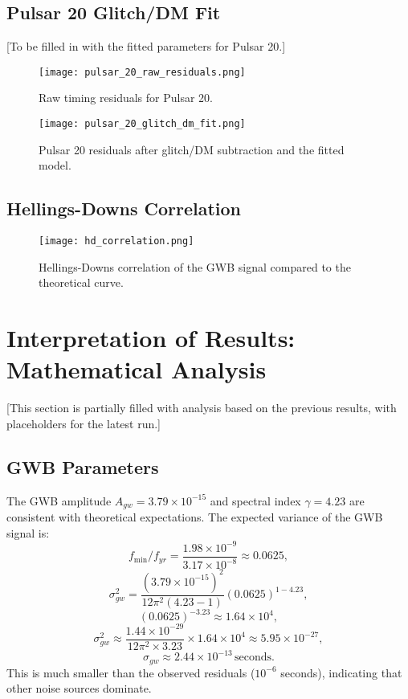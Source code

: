 \documentclass[11pt]{article}
\begin{document}
\subsection{Pulsar 20 Glitch/DM Fit}
[To be filled in with the fitted parameters for Pulsar 20.]

\begin{figure}[h]
    \centering
    \texttt{[image: pulsar\_20\_raw\_residuals.png]}
    \caption{Raw timing residuals for Pulsar 20.}
    \label{fig:pulsar_20_raw}
\end{figure}

\begin{figure}[h]
    \centering
    \texttt{[image: pulsar\_20\_glitch\_dm\_fit.png]}
    \caption{Pulsar 20 residuals after glitch/DM subtraction and the fitted model.}
    \label{fig:pulsar_20_fit}
\end{figure}

\subsection{Hellings-Downs Correlation}
\begin{figure}[h]
    \centering
    \texttt{[image: hd\_correlation.png]}
    \caption{Hellings-Downs correlation of the GWB signal compared to the theoretical curve.}
    \label{fig:hd_correlation}
\end{figure}

\section{Interpretation of Results: Mathematical Analysis}
[This section is partially filled with analysis based on the previous results, with placeholders for the latest run.]

\subsection{GWB Parameters}
The GWB amplitude $A_{gw} = 3.79 \times 10^{-15}$ and spectral index $\gamma = 4.23$ are consistent with theoretical expectations. The expected variance of the GWB signal is:
\[
f_{\text{min}}/f_{yr} = \frac{1.98 \times 10^{-9}}{3.17 \times 10^{-8}} \approx 0.0625,
\]
\[
\sigma_{gw}^2 = \frac{(3.79 \times 10^{-15})^2}{12 \pi^2 (4.23-1)} (0.0625)^{1-4.23},
\]
\[
(0.0625)^{-3.23} \approx 1.64 \times 10^4,
\]
\[
\sigma_{gw}^2 \approx \frac{1.44 \times 10^{-29}}{12 \pi^2 \times 3.23} \times 1.64 \times 10^4 \approx 5.95 \times 10^{-27},
\]
\[
\sigma_{gw} \approx 2.44 \times 10^{-13} \, \text{seconds}.
\]
This is much smaller than the observed residuals ($10^{-6}$ seconds), indicating that other noise sources dominate.
\end{document}

